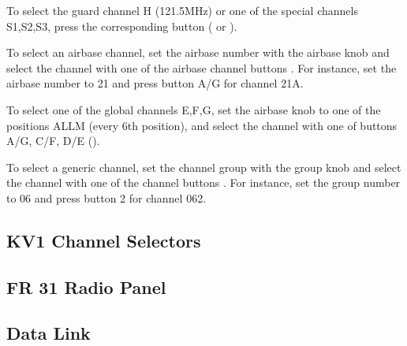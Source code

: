 \documentclass[a4paper]{report}
\begin{document}
{  To select the guard channel H (121.5MHz) or one of the special channels S1,S2,S3,
  press the corresponding button ( or
  ).

  To select an airbase channel, set the airbase number with the airbase knob 
  and select the channel with one of the airbase channel buttons .
  For instance, set the airbase number to 21 and press button A/G for channel 21A.

  To select one of the global channels E,F,G, set the airbase knob 
  to one of the positions ALLM (every 6th position), and select the channel
  with one of buttons A/G, C/F, D/E ().

  To select a generic channel, set the channel group with the group knob 
  and select the channel with one of the channel buttons .
  For instance, set the group number to 06 and press button 2 for channel 062.
}{
  \subsection{KV1 Channel Selectors}

  \subsection{FR 31 Radio Panel}

  \subsection{Data Link}
}
\end{document}

